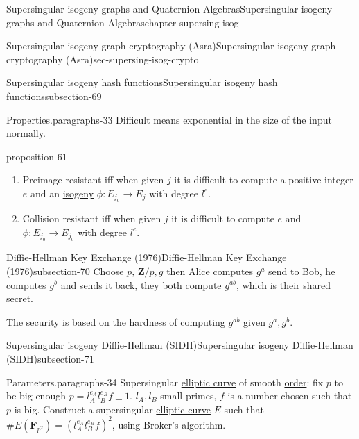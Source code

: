 \documentclass[oneside,10pt,]{book}
\numberwithin{equation}{section}
\newcommand{\ZZ}{\mathbf{Z}}
\newcommand{\FF}{\mathbf{F}}
\begin{document}
\begin{chapterptx}{Supersingular isogeny graphs and Quaternion Algebras}{}{Supersingular isogeny graphs and Quaternion Algebras}{}{}{chapter-supersing-isog}
\begin{sectionptx}{Supersingular isogeny graph cryptography (Asra)}{}{Supersingular isogeny graph cryptography (Asra)}{}{}{sec-supersing-isog-crypto}
\begin{subsectionptx}{Supersingular isogeny hash functions}{}{Supersingular isogeny hash functions}{}{}{subsection-69}
\begin{paragraphs}{Properties.}{paragraphs-33}
\hypertarget{p-837}{}%
Difficult means exponential in the size of the input normally.%
\begin{proposition}{}{}{proposition-61}%
\hypertarget{p-838}{}%
\leavevmode%
\begin{enumerate}
\item\hypertarget{li-210}{}Preimage resistant iff when given \(j\) it is difficult to compute a positive integer \(e\) and an \hyperref[def-supersing-isog-isog]{isogeny} \(\phi\colon E_{j_0} \to E_j\) with degree \(l^e\).%
\item\hypertarget{li-211}{}Collision resistant iff when given \(j\) it is difficult to compute \(e\) and  \(\phi \colon E_{j_0} \to E_{j_0}\) with degree \(l^e\).%
\end{enumerate}
%
\end{proposition}
\end{paragraphs}%
\end{subsectionptx}
%
%
\typeout{************************************************}
\typeout{************************************************}
%
\begin{subsectionptx}{Diffie-Hellman Key Exchange (1976)}{}{Diffie-Hellman Key Exchange (1976)}{}{}{subsection-70}
\hypertarget{p-839}{}%
Choose \(p,\, \ZZ/p, g\) then Alice computes \(g^a\) send to Bob, he computes \(g^b\) and sends it back, they both compute \(g^{ab}\), which is their shared secret.%
\par
\hypertarget{p-840}{}%
The security is based on the hardness of computing \(g^{ab}\) given \(g^a,g^b\).%
\end{subsectionptx}
%
%
\typeout{************************************************}
\typeout{************************************************}
%
\begin{subsectionptx}{Supersingular isogeny Diffie-Hellman (SIDH)}{}{Supersingular isogeny Diffie-Hellman (SIDH)}{}{}{subsection-71}
\begin{paragraphs}{Parameters.}{paragraphs-34}%
\hypertarget{p-841}{}%
Supersingular \hyperref[def-supersing-isog-ec]{elliptic curve} of smooth \hyperref[def-order-quaternion]{order}: fix \(p\) to be big enough \(p = l_A^{e_A} l_B^{e_B} f  \pm 1\). \(l_A,l_B\) small primes, \(f\) is a number chosen such that \(p\) is big. Construct a supersingular \hyperref[def-supersing-isog-ec]{elliptic curve} \(E\) such that \(\# E(\FF_{p^2}) = (l_A^{e_A}l_B^{e_B} f)^2\), using Broker's algorithm.%

\end{paragraphs}
\end{subsectionptx}
\end{sectionptx}
\end{chapterptx}
\end{document}
